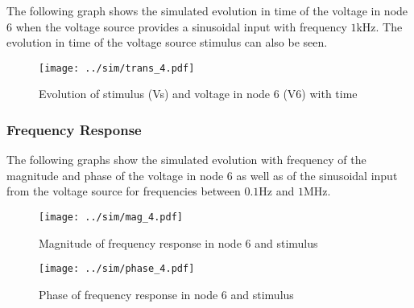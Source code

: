 The following graph shows the simulated evolution in time of the voltage in node 6 when the voltage source provides a sinusoidal input with frequency $1$kHz. The evolution in time of the voltage source stimulus can also be seen.

\begin{figure}[H] \centering
\texttt{[image: ../sim/trans\_4.pdf]}
\caption{Evolution of stimulus (Vs) and voltage in node 6 (V6) with time}
\label{fig:final_sim}
\end{figure}

\subsubsection{Frequency Response}

The following graphs show the simulated evolution with frequency of the magnitude and phase of the voltage in node 6 as well as of the sinusoidal input from the voltage source for frequencies between $0.1$Hz and $1$MHz.

\begin{figure}[H] \centering
\texttt{[image: ../sim/mag\_4.pdf]}
\caption{Magnitude of frequency response in node 6 and stimulus}
\label{fig:mag_sim}
\end{figure}


\begin{figure}[H] \centering
\texttt{[image: ../sim/phase\_4.pdf]}
\caption{Phase of frequency response in node 6 and stimulus}
\label{fig:phase_sim}
\end{figure}
